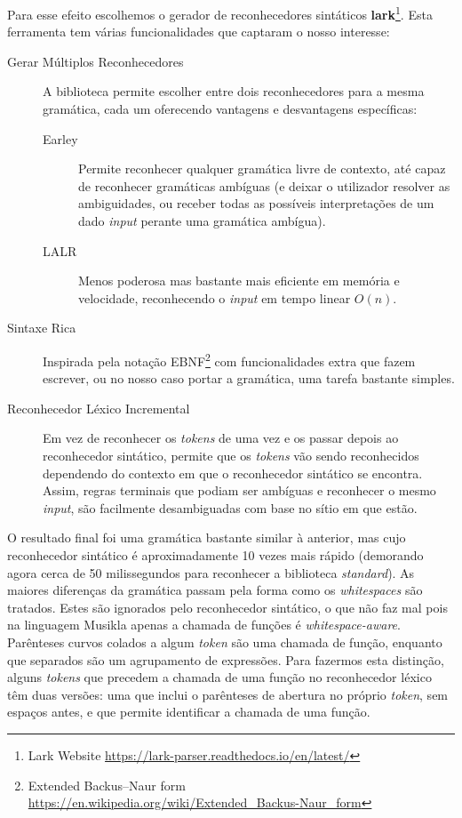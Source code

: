 Para esse efeito escolhemos o gerador de reconhecedores sintáticos \textbf{lark}\footnote{Lark Website \url{https://lark-parser.readthedocs.io/en/latest/}}. Esta ferramenta tem várias funcionalidades que captaram o nosso interesse:
\begin{description}
 \item[Gerar Múltiplos Reconhecedores] A biblioteca permite escolher entre dois reconhecedores para a mesma gramática, cada um oferecendo vantagens e desvantagens específicas:
    \begin{description}
     \item[Earley] Permite reconhecer qualquer gramática livre de contexto, até capaz de reconhecer gramáticas ambíguas (e deixar o utilizador resolver as ambiguidades, ou receber todas as possíveis interpretações de um dado \textit{input} perante uma gramática ambígua).
     \item[LALR] Menos poderosa mas bastante mais eficiente em memória e velocidade, reconhecendo o \textit{input} em tempo linear $O(n)$.
    \end{description}
 \item[Sintaxe Rica] Inspirada pela notação EBNF\footnote{Extended Backus–Naur form \url{https://en.wikipedia.org/wiki/Extended\_Backus-Naur\_form}} com funcionalidades extra que fazem escrever, ou no nosso caso portar a gramática, uma tarefa bastante simples. 
 \item[Reconhecedor Léxico Incremental] Em vez de reconhecer os \textit{tokens} de uma vez e os passar depois ao reconhecedor sintático, permite que os \textit{tokens} vão sendo reconhecidos dependendo do contexto em que o reconhecedor sintático se encontra. Assim, regras terminais que podiam ser ambíguas e reconhecer o mesmo \textit{input}, são facilmente desambiguadas com base no sítio em que estão.
\end{description}

O resultado final foi uma gramática bastante similar à anterior, mas cujo reconhecedor sintático é aproximadamente 10 vezes mais rápido (demorando agora cerca de 50 milissegundos para reconhecer a biblioteca \textit{standard}). As maiores diferenças da gramática passam pela forma como os \textit{whitespaces} são tratados. Estes são ignorados pelo reconhecedor sintático, o que não faz mal pois na linguagem Musikla apenas a chamada de funções é \textit{whitespace-aware}. Parênteses curvos colados a algum \textit{token} são uma chamada de função, enquanto que separados são um agrupamento de expressões. Para fazermos esta distinção, alguns \textit{tokens} que precedem a chamada de uma função no reconhecedor léxico têm duas versões: uma que inclui o parênteses de abertura no próprio \textit{token}, sem espaços antes, e que permite identificar a chamada de uma função.

